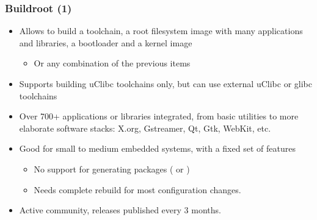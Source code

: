 \begin{frame}
  \frametitle{Buildroot (1)}
  \begin{itemize}
  \item Allows to build a toolchain, a root filesystem image with many
    applications and libraries, a bootloader and a kernel image
    \begin{itemize}
    \item Or any combination of the previous items
    \end{itemize}
  \item Supports building uClibc toolchains only, but can use external
    uClibc or glibc toolchains
  \item Over 700+ applications or libraries integrated, from basic
    utilities to more elaborate software stacks: X.org, Gstreamer, Qt,
    Gtk, WebKit, etc.
  \item Good for small to medium embedded systems, with a fixed set of
    features
    \begin{itemize}
    \item No support for generating packages ( or
      )
    \item Needs complete rebuild for most configuration changes.
    \end{itemize}
  \item Active community, releases published every 3 months.
  \end{itemize}
\end{frame}

